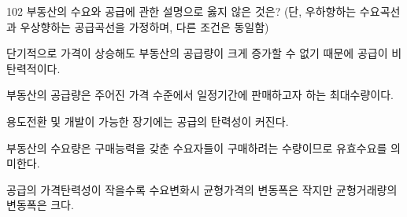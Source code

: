 \begin{question}{102}
부동산의 수요와 공급에 관한 설명으로 옳지 않은 것은? (단, 우하향하는 수요곡선과 우상향하는 공급곡선을 가정하며, 다른 조건은 동일함)
\begin{choices}
  \item 단기적으로 가격이 상승해도 부동산의 공급량이 크게 증가할 수 없기 때문에 공급이 비탄력적이다.
  \item 부동산의 공급량은 주어진 가격 수준에서 일정기간에 판매하고자 하는 최대수량이다.
  \item 용도전환 및 개발이 가능한 장기에는 공급의 탄력성이 커진다.
  \item 부동산의 수요량은 구매능력을 갖춘 수요자들이 구매하려는 수량이므로 유효수요를 의미한다.
  \item 공급의 가격탄력성이 작을수록 수요변화시 균형가격의 변동폭은 작지만 균형거래량의 변동폭은 크다.
\end{choices}
\end{question}
